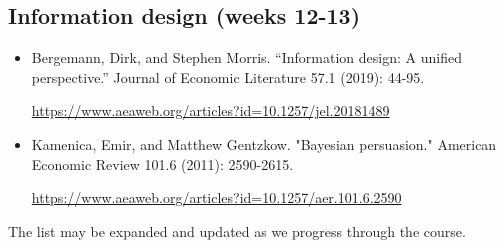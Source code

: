 \documentclass{article}
\begin{document}
\subsection{Information design (weeks 12-13)}
\begin{itemize}
	\item Bergemann, Dirk, and Stephen Morris. ``Information design: A unified perspective.'' Journal of Economic Literature 57.1 (2019): 44-95. 
	
	\url{https://www.aeaweb.org/articles?id=10.1257/jel.20181489}
%	
	\item Kamenica, Emir, and Matthew Gentzkow. "Bayesian persuasion." American Economic Review 101.6 (2011): 2590-2615.
	
	\url{https://www.aeaweb.org/articles?id=10.1257/aer.101.6.2590}
\end{itemize}

\bigskip
The list may be expanded and updated as we progress through the course.


\end{document}
